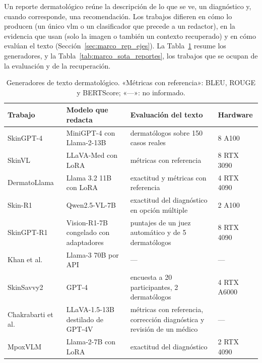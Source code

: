 Un reporte dermatológico reúne la descripción de lo que se ve, un diagnóstico y, cuando corresponde, una
recomendación. Los trabajos difieren en cómo lo producen (un único \gls{vlm} o un clasificador que precede a un
redactor), en la evidencia que usan (solo la imagen o también un contexto recuperado) y en cómo evalúan el texto
(Sección~\ref{sec:marco_rep_ejes}). La Tabla~\ref{tab:marco_generadores} resume los generadores, y la
Tabla~\ref{tab:marco_sota_reportes}, los trabajos que se ocupan de la evaluación y de la recuperación.

\begin{table}[!t]
    \centering
    \caption{Generadores de texto dermatológico. «Métricas con referencia»: BLEU, ROUGE y BERTScore; «---»: no
    informado.}
    \label{tab:marco_generadores}
    \small
    \begin{tabularx}{\textwidth}{@{}>{\raggedright\arraybackslash}p{3.2cm}
        >{\raggedright\arraybackslash\hspace{0pt}}X >{\raggedright\arraybackslash\hspace{0pt}}X l@{}}
        \toprule
        \textbf{Trabajo} & \textbf{Modelo que redacta} & \textbf{Evaluación del texto} & \textbf{Hardware} \\
        \midrule
        SkinGPT-4~\cite{zhou2024pretrained} & MiniGPT-4 con Llama-2-13B & dermatólogos sobre 150 casos reales & 8 A100 \\
        \filasep
        SkinVL~\cite{zeng2025mmskin} & LLaVA-Med con LoRA & métricas con referencia & 8 RTX 3090 \\
        \filasep
        DermatoLlama~\cite{yilmaz2025resourceefficient} & Llama 3.2 11B con LoRA & exactitud y métricas con referencia & 4 RTX 4090 \\
        \filasep
        Skin-R1~\cite{liu2025skinr1} & Qwen2.5-VL-7B & exactitud del diagnóstico en opción múltiple & 2 A100 \\
        \filasep
        SkinGPT-R1~\cite{shen2025skingptr1} & Vision-R1-7B congelado con adaptadores & puntajes de un juez automático y de 5 dermatólogos & 8 RTX 4090 \\
        \filasep
        Khan et al.~\cite{khan2025ensemble} & Llama-3 70B por API & --- & --- \\
        \filasep
        SkinSavvy2~\cite{kim2025skinsavvy2} & GPT-4 & encuesta a 20 participantes, 2 dermatólogos & 4 RTX A6000 \\
        \filasep
        Chakrabarti et al.~\cite{chakrabarti2025skin} & LLaVA-1.5-13B destilado de GPT-4V & métricas con referencia, corrección diagnóstica y revisión de un médico & --- \\
        \filasep
        MpoxVLM~\cite{cao2024mpoxvlm} & Llama-2-7B con LoRA & exactitud del diagnóstico & 2 RTX 4090 \\
        \bottomrule
    \end{tabularx}
\end{table}

